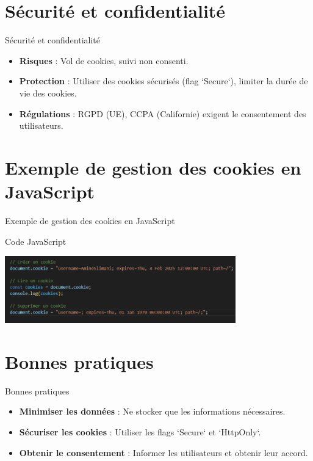 \documentclass{clbeamer2024}
\begin{document}
\section{Sécurité et confidentialité}
\begin{frame}{Sécurité et confidentialité}
	\begin{itemize}
		\item \textbf{Risques} : Vol de cookies, suivi non consenti.
		\item \textbf{Protection} : Utiliser des cookies sécurisés (flag `Secure`), limiter la durée de vie des cookies.
		\item \textbf{Régulations} : RGPD (UE), CCPA (Californie) exigent le consentement des utilisateurs.
	\end{itemize}
\end{frame}


\section{Exemple de gestion des cookies en JavaScript}
\begin{frame}{Exemple de gestion des cookies en JavaScript}
	\begin{exampleblock}{Code JavaScript}
			\begin{center}
			\includegraphics[width=10cm]{test/code.png} 
		\end{center}
		
	\end{exampleblock}
\end{frame}

\section{Bonnes pratiques}
\begin{frame}{Bonnes pratiques}
	\begin{itemize}
		\item \textbf{Minimiser les données} : Ne stocker que les informations nécessaires.
		\item \textbf{Sécuriser les cookies} : Utiliser les flags `Secure` et `HttpOnly`.
		\item \textbf{Obtenir le consentement} : Informer les utilisateurs et obtenir leur accord.
	\end{itemize}
\end{frame}
\end{document}

